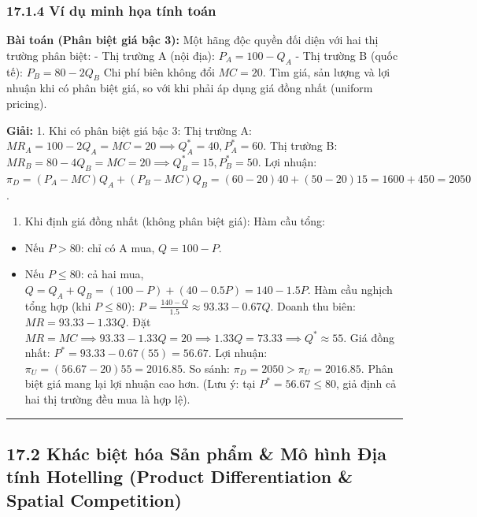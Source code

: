 \documentclass[
]{article}
\providecommand{\tightlist}{%
  \setlength{\itemsep}{0pt}\setlength{\parskip}{0pt}}
\begin{document}
\subsubsection{17.1.4 Ví dụ minh họa tính
toán}\label{vuxed-dux1ee5-minh-hux1ecda-tuxednh-touxe1n}

\textbf{Bài toán (Phân biệt giá bậc 3):} Một hãng độc quyền đối diện với
hai thị trường phân biệt: - Thị trường A (nội địa): \(P_A = 100 - Q_A\)
- Thị trường B (quốc tế): \(P_B = 80 - 2Q_B\) Chi phí biên không đổi
\(MC = 20\). Tìm giá, sản lượng và lợi nhuận khi có phân biệt giá, so
với khi phải áp dụng giá đồng nhất (uniform pricing).

\textbf{Giải:} 1. Khi có phân biệt giá bậc 3: Thị trường A:
\(MR_A = 100 - 2Q_A = MC = 20 \implies Q_A^* = 40, P_A^* = 60\). Thị
trường B:
\(MR_B = 80 - 4Q_B = MC = 20 \implies Q_B^* = 15, P_B^* = 50\). Lợi
nhuận:
\(\pi_D = (P_A - MC)Q_A + (P_B - MC)Q_B = (60-20)40 + (50-20)15 = 1600 + 450 = 2050\).

\begin{enumerate}
\def\labelenumi{\arabic{enumi}.}
\setcounter{enumi}{1}
\tightlist
\item
  Khi định giá đồng nhất (không phân biệt giá): Hàm cầu tổng:
\end{enumerate}

\begin{itemize}
\tightlist
\item
  Nếu \(P > 80\): chỉ có A mua, \(Q = 100 - P\).
\item
  Nếu \(P \le 80\): cả hai mua,
  \(Q = Q_A + Q_B = (100 - P) + (40 - 0.5P) = 140 - 1.5P\). Hàm cầu
  nghịch tổng hợp (khi \(P \le 80\)):
  \(P = \frac{140 - Q}{1.5} \approx 93.33 - 0.67Q\). Doanh thu biên:
  \(MR = 93.33 - 1.33Q\). Đặt
  \(MR = MC \implies 93.33 - 1.33Q = 20 \implies 1.33Q = 73.33 \implies Q^* \approx 55\).
  Giá đồng nhất: \(P^* = 93.33 - 0.67(55) = 56.67\). Lợi nhuận:
  \(\pi_U = (56.67 - 20)55 = 2016.85\). So sánh:
  \(\pi_D = 2050 > \pi_U = 2016.85\). Phân biệt giá mang lại lợi nhuận
  cao hơn. (Lưu ý: tại \(P^* = 56.67 \le 80\), giả định cả hai thị
  trường đều mua là hợp lệ).
\end{itemize}

\begin{center}\rule{0.5\linewidth}{0.5pt}\end{center}

\subsection{17.2 Khác biệt hóa Sản phẩm \& Mô hình Địa tính Hotelling
(Product Differentiation \& Spatial
Competition)}\label{khuxe1c-biux1ec7t-huxf3a-sux1ea3n-phux1ea9m-muxf4-huxecnh-ux111ux1ecba-tuxednh-hotelling-product-differentiation-spatial-competition}
\end{document}
